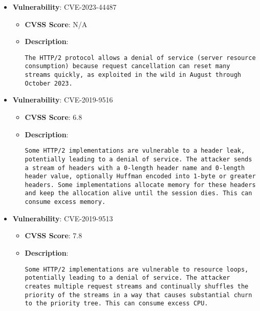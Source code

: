 \documentclass{article}
\begin{document}
\begin{itemize}
    
        \item \textbf{Vulnerability}: CVE-2023-44487
        \begin{itemize}
            \item \textbf{CVSS Score}:  N/A 
            \item \textbf{Description}:
            \parbox[t]{0.9\linewidth}{
                \verb|The HTTP/2 protocol allows a denial of service (server resource consumption) because request cancellation can reset many streams quickly, as exploited in the wild in August through October 2023.|
            }
        \end{itemize}
    
        \item \textbf{Vulnerability}: CVE-2019-9516
        \begin{itemize}
            \item \textbf{CVSS Score}:  6.8 
            \item \textbf{Description}:
            \parbox[t]{0.9\linewidth}{
                \verb|Some HTTP/2 implementations are vulnerable to a header leak, potentially leading to a denial of service. The attacker sends a stream of headers with a 0-length header name and 0-length header value, optionally Huffman encoded into 1-byte or greater headers. Some implementations allocate memory for these headers and keep the allocation alive until the session dies. This can consume excess memory.|
            }
        \end{itemize}
    
        \item \textbf{Vulnerability}: CVE-2019-9513
        \begin{itemize}
            \item \textbf{CVSS Score}:  7.8 
            \item \textbf{Description}:
            \parbox[t]{0.9\linewidth}{
                \verb|Some HTTP/2 implementations are vulnerable to resource loops, potentially leading to a denial of service. The attacker creates multiple request streams and continually shuffles the priority of the streams in a way that causes substantial churn to the priority tree. This can consume excess CPU.|
            }
        \end{itemize}
    

\end{itemize}
\end{document}
